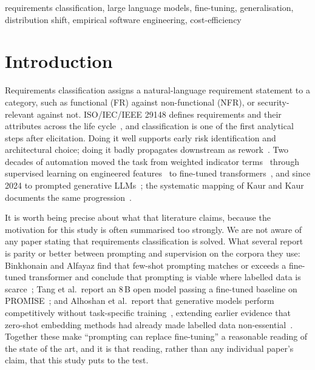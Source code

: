 \documentclass[conference]{IEEEtran}
\begin{document}
\begin{IEEEkeywords}
requirements classification, large language models, fine-tuning,
generalisation, distribution shift, empirical software engineering,
cost-efficiency
\end{IEEEkeywords}

\section{Introduction}
Requirements classification assigns a natural-language requirement statement to
a category, such as functional (FR) against non-functional (NFR), or
security-relevant against not. ISO/IEC/IEEE 29148 defines requirements and their
attributes across the life cycle~\cite{iso29148}, and classification is one of
the first analytical steps after elicitation. Doing it well supports early risk
identification and architectural choice; doing it badly propagates downstream as
rework~\cite{clelandhuang2007}. Two decades of automation moved the task from
weighted indicator terms~\cite{clelandhuang2007} through supervised learning on
engineered features~\cite{kurtanovic2017} to fine-tuned
transformers~\cite{hey2020norbert}, and since 2024 to prompted generative
LLMs~\cite{elhajjami2024,binkhonain2025,alhoshan2025,tang2025,levy2026}; the
systematic mapping of Kaur and Kaur documents the same
progression~\cite{kaur2024}.

It is worth being precise about what that literature claims, because the
motivation for this study is often summarised too strongly. We are not aware of
any paper stating that requirements classification is solved. What several
report is parity or better between prompting and supervision on the corpora they
use: Binkhonain and Alfayaz find that few-shot prompting matches or exceeds a
fine-tuned transformer and conclude that prompting is viable where labelled data
is scarce~\cite{binkhonain2025}; Tang et al.\ report an 8\,B open model passing a
fine-tuned baseline on PROMISE~\cite{tang2025}; and Alhoshan et al.\ report that
generative models perform competitively without task-specific
training~\cite{alhoshan2025}, extending earlier evidence that zero-shot embedding
methods had already made labelled data non-essential~\cite{alhoshan2023}.
Together these make ``prompting can replace fine-tuning'' a reasonable reading of
the state of the art, and it is that reading, rather than any individual paper's
claim, that this study puts to the test.
\end{document}
